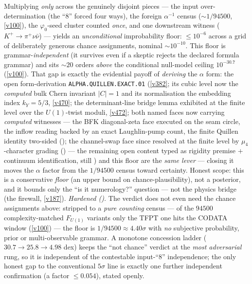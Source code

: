 \begin{keybox}
Multiplying \emph{only} across the genuinely disjoint pieces --- the input over-determination (the ``$8$''
forced four ways), the foreign $\alpha^{-1}$ census ($\sim1/94500$, \vref{v100}), the $\varphi_0$-seed cluster
counted \emph{once}, and one downstream witness ($K^+\!\to\!\pi^+\nu\bar\nu$) --- yields an \emph{unconditional}
improbability floor: $\le 10^{-6}$ across a grid of deliberately generous chance assignments, nominal
$\sim 10^{-10}$. This floor is grammar-\emph{independent} (it survives even if a skeptic rejects the declared
formula grammar) and sits $\sim20$ orders \emph{above} the conditional null-model ceiling $10^{-30.7}$
(\vref{v100}). That gap is exactly the evidential payoff of \emph{deriving} the $\alpha$ form: the open
form-derivation \texttt{ALPHA.QUILLEN.EXACT.01} (\vref{v382}; its cubic level now the \emph{computed} bulk Chern
invariant $|C|{=}1$ and its normalisation the embedding index $k_Y{=}5/3$, \vref{v470}; the determinant-line
bridge lemma exhibited at the finite level over the $U(1)$-twist moduli, \vref{v472}; both named faces now
carrying \emph{computed} witnesses --- the BFK diagonal-zeta face executed on the seam circle, the inflow
reading backed by an exact Laughlin-pump count, the finite Quillen identity two-sided
(); the channel-swap face since resolved at the finite level by
$\mu_4$-character grading () --- the remaining open content typed
as rigidity premise $+$ continuum identification, still \mO) and this
floor are the \emph{same lever} ---
closing it moves the $\alpha$ factor from the $1/94500$ census toward certainty. Honest scope: this is a
conservative \emph{floor} (an upper bound on chance-plausibility), not a posterior, and it bounds only the
``is it numerology?'' question --- not the physics bridge (the firewall, \vref{v187}).
\emph{Hardened ().} The verdict does not even need the chance assignments
above: stripped to a \emph{pure counting} census --- of the $94500$ complexity-matched $F_{U(1)}$ variants
only the TFPT one hits the CODATA window (\vref{v100}) --- the floor is $1/94500\approx4.40\sigma$ with
\emph{no} subjective probability, prior or multi-observable grammar. A monotone concession ladder
($30.7\!\to\!25.8\!\to\!4.98$ dex) keeps the ``not chance'' verdict at the \emph{most adversarial} rung, so
it is independent of the contestable input-``$8$'' independence; the only honest gap to the conventional
$5\sigma$ line is exactly one further independent confirmation (a factor $\le0.054$), stated openly.
\end{keybox}
